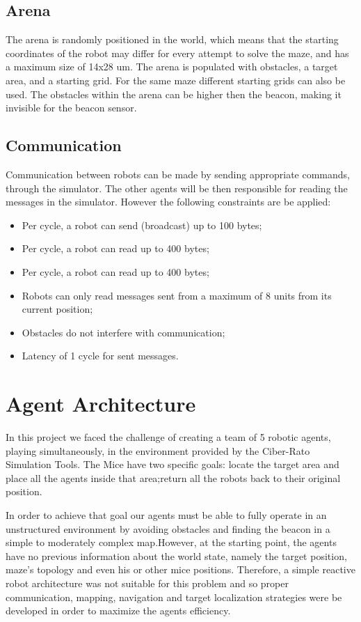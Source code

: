\documentclass[oribibl]{llncs}
\begin{document}
\subsection{Arena}
The arena is randomly positioned in the world, which means that the starting coordinates of the robot may differ for every attempt to solve the maze, and has a maximum size of 14x28 um.
The arena is populated with obstacles, a target area, and a starting grid. For the same maze different starting grids can also be used. The obstacles within the arena can be higher then the beacon, making it invisible for the beacon sensor.

\subsection{Communication}
Communication between robots can be made by sending appropriate commands, through the simulator. The other agents will be then responsible for reading the messages in the simulator. However the following constraints are be applied:
\begin{itemize}
 \item Per cycle, a robot can send (broadcast) up to 100 bytes;
 \item Per cycle, a robot can read up to 400 bytes;
 \item Per cycle, a robot can read up to 400 bytes;
 \item Robots can only read messages sent from a maximum of 8 units from its current position;
 \item Obstacles do not interfere with communication;
 \item Latency of 1 cycle for sent messages.
 \end{itemize} 

\section{Agent Architecture}
In this project we faced the challenge of creating a team of 5 robotic agents, playing simultaneously, in the environment provided by the Ciber-Rato Simulation Tools. The Mice have two specific goals: locate the target area and place all the agents inside that area;return all the robots back to their original position.

In order to achieve that goal our agents must be able to fully operate in an unstructured environment by avoiding obstacles and finding the beacon in a simple to moderately complex map.However, at the starting point, the agents have no previous information about the world state, namely the target position, maze's topology and even his or other mice positions. Therefore, a simple reactive robot architecture was not suitable for this problem and so proper communication, mapping, navigation and target localization strategies were be developed in order to maximize the agents efficiency.
\end{document}
